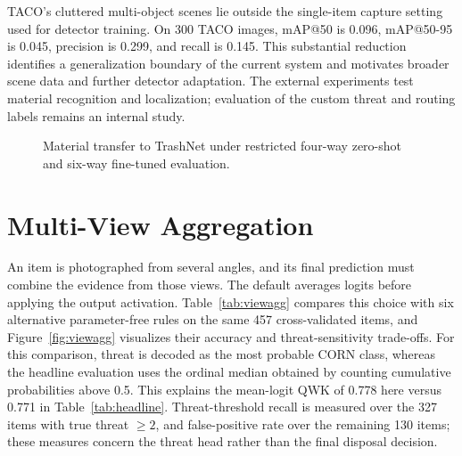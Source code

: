 TACO's cluttered multi-object scenes lie outside the single-item capture setting used for detector training. On 300 TACO images, mAP@50 is 0.096, mAP@50-95 is 0.045, precision is 0.299, and recall is 0.145. This substantial reduction identifies a generalization boundary of the current system and motivates broader scene data and further detector adaptation. The external experiments test material recognition and localization; evaluation of the custom threat and routing labels remains an internal study.

\begin{figure}[!ht]
    \centering
    \caption{Material transfer to TrashNet under restricted four-way zero-shot and six-way fine-tuned evaluation.}
    \label{fig:extval}
\end{figure}

\section{Multi-View Aggregation}
\label{sec:viewagg}
An item is photographed from several angles, and its final prediction must combine the evidence from those views. The default averages logits before applying the output activation. Table~\ref{tab:viewagg} compares this choice with six alternative parameter-free rules on the same 457 cross-validated items, and Figure~\ref{fig:viewagg} visualizes their accuracy and threat-sensitivity trade-offs. For this comparison, threat is decoded as the most probable CORN class, whereas the headline evaluation uses the ordinal median obtained by counting cumulative probabilities above 0.5. This explains the mean-logit QWK of 0.778 here versus 0.771 in Table~\ref{tab:headline}. Threat-threshold recall is measured over the 327 items with true threat $\geq 2$, and false-positive rate over the remaining 130 items; these measures concern the threat head rather than the final disposal decision.

